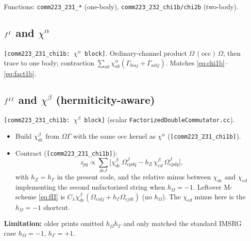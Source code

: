 \documentclass[enabledeprecatedfontcommands]{scrartcl}
\newcommand{\codename}[1]{\texttt{#1}}
\newcommand{\coderef}[1]{\textcolor{codeblue}{\texttt{[#1]}}}
\newcommand{\MyRomanNum}[1]{%
  \ifcase#1\or I\or II\or III\or IV\or V\or VI\or VII\or VIII\or IX\or X\else #1\fi}
\begin{document}
Functions: \codename{comm223\_231\_*} (one-body),
\codename{comm223\_232\_chi1b/chi2b} (two-body).

\subsection{$f^{\MyRomanNum{1}}$ and $\chi^\alpha$}
\label{sec:code-fI}

\coderef{comm223\_231\_chi1b: $\chi^\alpha$ block}.
Ordinary-channel product $\Omega\,(\mathrm{occ})\,\Omega$, then trace to
one body; contraction
$\sum_{ab}\chi^\alpha_{ab}(\Gamma_{biaj}+\Gamma_{aibj})$.
Matches \eqref{eq:chi1b}--\eqref{eq:fact1b}.

\subsection{$f^{\MyRomanNum{2}}$ and $\chi^\beta$ (hermiticity-aware)}
\label{sec:code-fII}

\coderef{comm223\_231\_chi1b: $\chi^\beta$ block} (scalar
\codename{FactorizedDoubleCommutator.cc}).
\begin{itemize}
  \item Build $\chi^\beta_{de}$ from $\Omega\Gamma$ with the same occ kernel as
    $\chi^\alpha$ (\coderef{comm223\_231\_chi1b}).
  \item Contract (\coderef{comm223\_231\_chi1b}):
  \begin{equation}
    z_{pq}\propto\sum_{de J}
    \bigl[\chi^\beta_{de}\,\Omega^{J}_{epdq}
         -h_Z\,\chi^\beta_{ed}\,\Omega^{J}_{epdq}\bigr],
  \end{equation}
  with $h_Z=h_\Gamma$ in the present code, and the relative minus between
  $\chi_{de}$ and $\chi_{ed}$ implementing the second unfactorized string when
  $h_\Omega=-1$.
  Leftover M-scheme \eqref{eq:fII} is
  $C_\lambda\chi^\beta_{de}(\Omega_{eidj}+h_\Gamma\Omega_{ejdi})$
  (no $h_\Omega$). The $\chi_{ed}$ minus here is the $h_\Omega=-1$ shortcut.
\end{itemize}
\textbf{Limitation:} older prints omitted $h_\Omega h_\Gamma$ and only matched
the standard IMSRG case $h_\Omega=-1$, $h_\Gamma=+1$.
\end{document}
